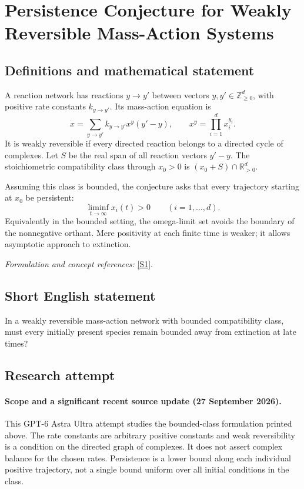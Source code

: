 \documentclass[11pt]{article}
\begin{document}
\section*{\texorpdfstring{Persistence Conjecture for Weakly Reversible Mass-Action Systems}{Persistence Conjecture for Weakly Reversible Mass-Action Systems}}\label{481}
\subsection{Definitions and mathematical statement}
A reaction network has reactions $y\to y'$ between vectors $y,y'\in{\mathbb{Z}}_{\ge0}^d$, with positive rate constants $k_{y\to y'}$. Its mass-action equation is
\[
 \dot x=\sum_{y\to y'}k_{y\to y'}x^y(y'-y),
 \qquad x^y=\prod_{i=1}^dx_i^{y_i}.
\]
It is weakly reversible if every directed reaction belongs to a directed cycle of complexes. Let $S$ be the real span of all reaction vectors $y'-y$. The stoichiometric compatibility class through $x_0>0$ is $(x_0+S)\cap{\mathbb{R}}_{>0}^d$.

Assuming this class is bounded, the conjecture asks that every trajectory starting at $x_0$ be persistent:
\[
 \liminf_{t\to\infty}x_i(t)>0\qquad(i=1,\ldots,d).
\]
Equivalently in the bounded setting, the omega-limit set avoids the boundary of the nonnegative orthant. Mere positivity at each finite time is weaker; it allows asymptotic approach to extinction.
\par\smallskip\textit{Formulation and concept references:} \href{https://reaction-networks.net/wiki/Persistence_and_the_Global_Attractor_Conjecture}{[S1]}.

\subsection{Short English statement}
In a weakly reversible mass-action network with bounded compatibility class, must every initially present species remain bounded away from extinction at late times?
\subsection{Research attempt}

\paragraph{Scope and a significant recent source update (27 September 2026).}
This GPT-6 Astra Ultra attempt studies the bounded-class formulation
printed above. The rate constants are arbitrary positive constants and
weak reversibility is a condition on the directed graph of complexes.
It does not assert complex balance for the chosen rates. Persistence is
a lower bound along each individual positive trajectory, not a single
bound uniform over all initial conditions in the class.
\end{document}
